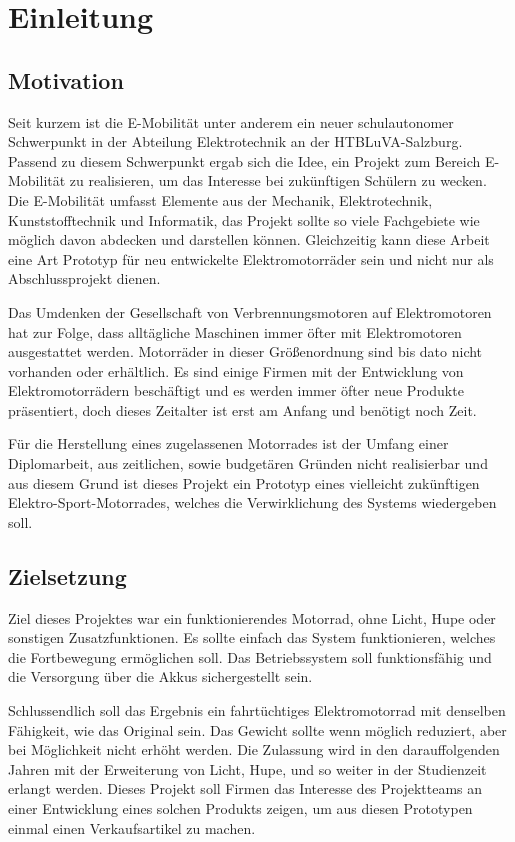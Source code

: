 \chapter{Einleitung}

\section{Motivation}
Seit kurzem ist die E-Mobilität unter anderem ein neuer schulautonomer Schwerpunkt in der Abteilung Elektrotechnik an der HTBLuVA-Salzburg. Passend zu diesem Schwerpunkt ergab sich die Idee, ein Projekt zum Bereich E-Mobilität zu realisieren, um das Interesse bei zukünftigen Schülern zu wecken.
Die E-Mobilität umfasst Elemente aus der Mechanik, Elektrotechnik, Kunststofftechnik und Informatik, das Projekt sollte so viele Fachgebiete wie möglich davon abdecken und darstellen können. Gleichzeitig kann diese Arbeit eine Art Prototyp für neu entwickelte Elektromotorräder sein und nicht nur als Abschlussprojekt dienen.

Das Umdenken der Gesellschaft von Verbrennungsmotoren auf Elektromotoren hat zur Folge, dass alltägliche Maschinen immer öfter mit Elektromotoren ausgestattet werden. Motorräder in dieser Größenordnung sind bis dato nicht vorhanden oder erhältlich. Es sind einige Firmen mit der Entwicklung von Elektromotorrädern beschäftigt und es werden immer öfter neue Produkte präsentiert, doch dieses Zeitalter ist erst am Anfang und benötigt noch Zeit.

Für die Herstellung eines zugelassenen Motorrades ist der Umfang einer Diplomarbeit, aus zeitlichen, sowie budgetären Gründen nicht realisierbar und aus diesem Grund ist dieses Projekt ein Prototyp eines vielleicht zukünftigen Elektro-Sport-Motorrades, welches die Verwirklichung des Systems wiedergeben soll.

\section{Zielsetzung}
Ziel dieses Projektes war ein funktionierendes Motorrad, ohne Licht, Hupe oder sonstigen Zusatzfunktionen. Es sollte einfach das System funktionieren, welches die Fortbewegung ermöglichen soll. Das Betriebssystem soll funktionsfähig und die Versorgung über die Akkus sichergestellt sein. 

Schlussendlich soll das Ergebnis ein fahrtüchtiges Elektromotorrad mit denselben Fähigkeit, wie das Original sein. Das Gewicht sollte wenn möglich reduziert, aber bei Möglichkeit nicht erhöht werden. Die Zulassung wird in den darauffolgenden Jahren mit der Erweiterung von Licht, Hupe, und so weiter in der Studienzeit erlangt werden. Dieses Projekt soll Firmen das Interesse des Projektteams an einer Entwicklung eines solchen Produkts zeigen, um aus diesen Prototypen einmal einen Verkaufsartikel zu machen.

